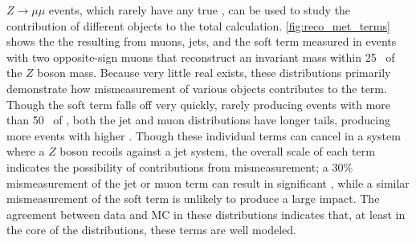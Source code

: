 $Z\rightarrow\mu\mu$ events, which rarely have any true \met, can be used to study the contribution of different objects to the total \met calculation. \autoref{fig:reco_met_terms} shows the the \met resulting from muons, jets, and the soft term measured in events with two opposite-sign muons that reconstruct an invariant mass within 25 \gev~of the $Z$ boson mass. Because very little real \met exists, these distributions primarily demonstrate how mismeasurement of various objects contributes to the \met term. Though the soft term falls off very quickly, rarely producing events with more than 50 \gev~of \met, both the jet and muon distributions have longer tails, producing more events with higher \met. Though these individual terms can cancel in a system where a $Z$ boson recoils against a jet system, the overall scale of each term indicates the possibility of contributions from mismeasurement; a 30\% mismeasurement of the jet or muon term can result in significant \met, while a similar mismeasurement of the soft term is unlikely to produce a large impact. The agreement between data and \ac{MC} in these distributions indicates that, at least in the core of the distributions, these \met terms are well modeled.  

